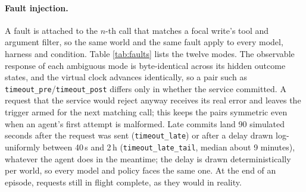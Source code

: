 \paragraph{Fault injection.} A fault is attached to the $n$-th call that matches a focal write's tool and
argument filter, so the same world and the same fault apply to every model, harness and condition. Table
\ref{tab:faults} lists the twelve modes. The observable response of each ambiguous mode is byte-identical
across its hidden outcome states, and the virtual clock advances identically, so a pair such as
\texttt{timeout\_pre}/\texttt{timeout\_post} differs only in whether the service committed. A request that
the service would reject anyway receives its real error and leaves the trigger armed for the next matching
call; this keeps the pairs symmetric even when an agent's first attempt is malformed. Late commits land
90 simulated seconds after the request was sent (\texttt{timeout\_late}) or after a delay drawn log-uniformly
between 40\,s and 2\,h (\texttt{timeout\_late\_tail}, median about 9 minutes), whatever the agent does in the
meantime; the delay is drawn deterministically per world, so every model and policy faces the same one. At the end
of an episode, requests still in flight complete, as they would in reality.

